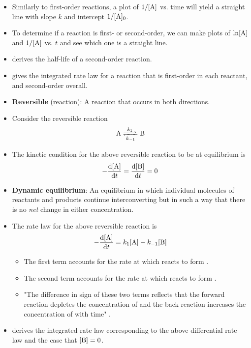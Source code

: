 \documentclass[../notes.tex]{subfiles}
\begin{document}
\begin{itemize}
    \item Similarly to first-order reactions, a plot of $1/[\ce{A}]$ vs. time will yield a straight line with slope $k$ and intercept $1/[\ce{A}]_0$.
    \item To determine if a reaction is first- or second-order, we can make plots of $\ln[\ce{A}]$ and $1/[\ce{A}]$ vs. $t$ and see which one is a straight line.
    \item \textcite{bib:McQuarrieSimon} derives the half-life of a second-order reaction.
    \item \textcite{bib:McQuarrieSimon} gives the integrated rate law for a reaction that is first-order in each reactant, and second-order overall.
    \item \textbf{Reversible} (reaction): A reaction that occurs in both directions.
    \item Consider the reversible reaction
    \begin{equation*}
        \ce{A <=>[$k_1$][$k_{-1}$] B}
    \end{equation*}
    \item The kinetic condition for the above reversible reaction to be at equilibrium is
    \begin{equation*}
        -\dv{[\ce{A}]}{t} = \dv{[\ce{B}]}{t} = 0
    \end{equation*}
    \item \textbf{Dynamic equilibrium}: An equilibrium in which individual molecules of reactants and products continue interconverting but in such a way that there is no \emph{net} change in either concentration.
    \item The rate law for the above reversible reaction is
    \begin{equation*}
        -\dv{[\ce{A}]}{t} = k_1[\ce{A}]-k_{-1}[\ce{B}]
    \end{equation*}
    \begin{itemize}
        \item The first term accounts for the rate at which  reacts to form .
        \item The second term accounts for the rate at which  reacts to form .
        \item "The difference in sign of these two terms reflects that the forward reaction depletes the concentration of  and the back reaction increases the concentration of  with time" \parencite[1063]{bib:McQuarrieSimon}.
    \end{itemize}
    \item \textcite{bib:McQuarrieSimon} derives the integrated rate law corresponding to the above differential rate law and the case that $[\ce{B}]=0$.

\end{itemize}
\end{document}
